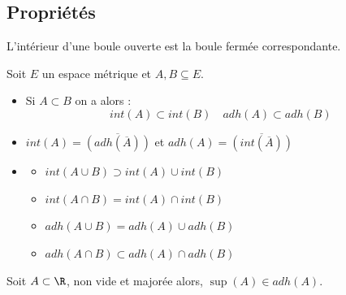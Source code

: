 \subsection{Propriétés}

\begin{proposition}
    L'intérieur d'une boule ouverte est la boule fermée correspondante. 
\end{proposition}

\begin{prop}
    Soit $E$ un espace métrique et $A,B \subseteq E$. 
    \begin{itemize}
        \item Si $A \subset B$ on a alors :
            \[ int(A) \subset int(B) \quad adh(A) \subset adh(B) \] 
        \item $int(A) = \overline{(adh(\overline{A}))} $ et $ adh(A) = \overline{(int(\overline{A}))}$ 
        \item 
        \begin{itemize}
            \item $ int(A \cup B) \supset int(A) \cup int(B) $
            \item $ int(A \cap B) = int(A) \cap int(B) $
            \item $ adh(A \cup B) = adh(A) \cup adh(B) $
            \item $ adh(A \cap B) \subset adh(A) \cap adh(B) $
        \end{itemize}
    \end{itemize}
\end{prop}

\begin{proposition}
    Soit $A \subset \R$, non vide et majorée alors, $\sup (A) \in adh(A)$. 
\end{proposition}





